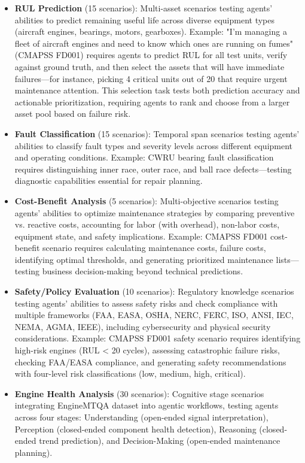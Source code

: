 \documentclass[conference]{IEEEtran}
\begin{document}
\begin{itemize}
    \item \textbf{RUL Prediction} (15 scenarios): Multi-asset scenarios testing agents' abilities to predict remaining useful life across diverse equipment types (aircraft engines, bearings, motors, gearboxes). Example: "I'm managing a fleet of aircraft engines and need to know which ones are running on fumes" (CMAPSS FD001) requires agents to predict RUL for all test units, verify against ground truth, and then select the assets that will have immediate failures—for instance, picking 4 critical units out of 20 that require urgent maintenance attention. This selection task tests both prediction accuracy and actionable prioritization, requiring agents to rank and choose from a larger asset pool based on failure risk.
    
    \item \textbf{Fault Classification} (15 scenarios): Temporal span scenarios testing agents' abilities to classify fault types and severity levels across different equipment and operating conditions. Example: CWRU bearing fault classification requires distinguishing inner race, outer race, and ball race defects—testing diagnostic capabilities essential for repair planning.
    
    \item \textbf{Cost-Benefit Analysis} (5 scenarios): Multi-objective scenarios testing agents' abilities to optimize maintenance strategies by comparing preventive vs. reactive costs, accounting for labor (with overhead), non-labor costs, equipment state, and safety implications. Example: CMAPSS FD001 cost-benefit scenario requires calculating maintenance costs, failure costs, identifying optimal thresholds, and generating prioritized maintenance lists—testing business decision-making beyond technical predictions.
    
    \item \textbf{Safety/Policy Evaluation} (10 scenarios): Regulatory knowledge scenarios testing agents' abilities to assess safety risks and check compliance with multiple frameworks (FAA, EASA, OSHA, NERC, FERC, ISO, ANSI, IEC, NEMA, AGMA, IEEE), including cybersecurity and physical security considerations. Example: CMAPSS FD001 safety scenario requires identifying high-risk engines (RUL < 20 cycles), assessing catastrophic failure risks, checking FAA/EASA compliance, and generating safety recommendations with four-level risk classifications (low, medium, high, critical).
    
    \item \textbf{Engine Health Analysis} (30 scenarios): Cognitive stage scenarios integrating EngineMTQA dataset \cite{lei2024itformer} into agentic workflows, testing agents across four stages: Understanding (open-ended signal interpretation), Perception (closed-ended component health detection), Reasoning (closed-ended trend prediction), and Decision-Making (open-ended maintenance planning).
\end{itemize}
\end{document}

